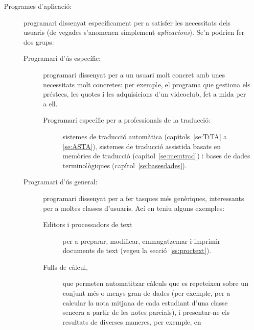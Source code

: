 \begin{description}
\item[Programes d'aplicació:] programari dissenyat específicament per
  a satisfer les necessitats dels usuaris (de vegades s'anomenen
  simplement {\em aplicacions}). Se'n podrien fer dos grups:
        \begin{description}
        \item[Programari d'ús específic:] programari dissenyat per a
          un usuari molt concret amb unes necessitats molt concretes:
          per exemple, el programa que gestiona els préstecs, les
          quotes i les adquisicions d'un videoclub, fet a mida per a
          ell.
          \begin{description}
          \item[Programari específic per a professionals de la
            traducció:] sistemes de traducció automàtica
            (capítols~\ref{se:TiTA} a \ref{se:ASTA}), sistemes de
            traducció assistida basats en memòries de traducció
            (capítol~\ref{se:memtrad}) i bases de dades
            terminològiques (capítol~\ref{se:basesdades}).
          \end{description}
        \item[Programari d'ús general:] programari dissenyat per a fer
          tasques més genèriques, interessants per a moltes classes
          d'usuaris. Ací en teniu alguns exemples:
                \begin{description}
                \item[Editors i processadors de text] per a preparar,
                  modificar, emmagatzemar i imprimir documents de text
                  (vegeu la secció~\ref{ss:proctext}).
                \item[Fulls de càlcul,] que permeten automatitzar
                  càlculs que es repeteixen sobre un conjunt més o
                  menys gran de dades (per exemple, per a calcular la
                  nota mitjana de cada estudiant d'una classe sencera
                  a partir de les notes parcials), i presentar-ne els
                  resultats de diverses maneres, per exemple, en

\end{description}
\end{description}
\end{description}
